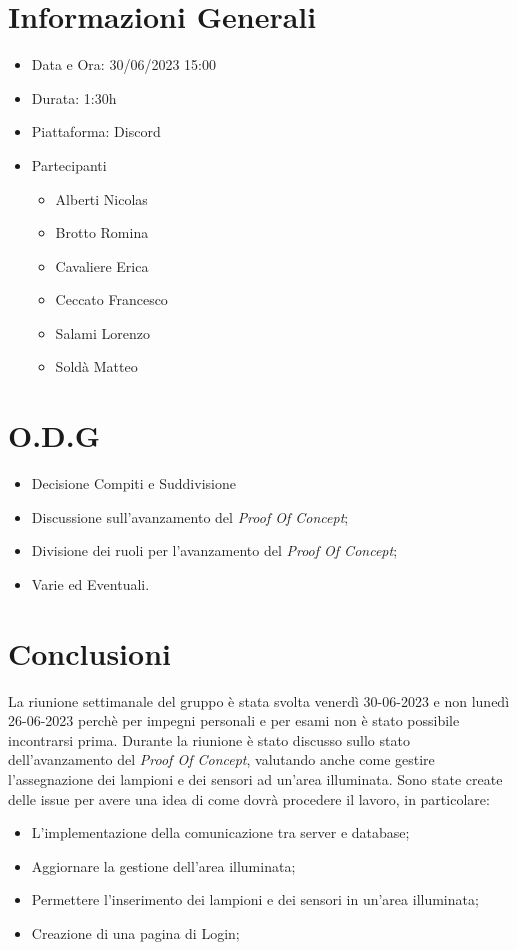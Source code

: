 \documentclass[a4paper, 12pt]{article}
\begin{document}
\makefrontpage

\section*{Informazioni Generali}
\begin{itemize}
    \item Data e Ora: 30/06/2023 15:00
    \item Durata: 1:30h
    \item Piattaforma: Discord
    \item Partecipanti
    \begin{itemize}
        \item Alberti Nicolas
        \item Brotto Romina
        \item Cavaliere Erica
        \item Ceccato Francesco
        \item Salami Lorenzo
        \item Soldà Matteo
    \end{itemize}
\end{itemize}

\section*{O.D.G}
\begin{itemize}
    \item Decisione Compiti e Suddivisione
    \item Discussione sull'avanzamento del \textit{Proof Of Concept};
    \item Divisione dei ruoli per l'avanzamento del \textit{Proof Of Concept};
    \item Varie ed Eventuali.
\end{itemize}

\section*{Conclusioni}
La riunione settimanale del gruppo è stata svolta venerdì 30-06-2023 e non lunedì 26-06-2023 perchè per impegni personali e per esami non è stato possibile incontrarsi prima.
Durante la riunione è stato discusso sullo stato dell'avanzamento del \textit{Proof Of Concept}, valutando anche come gestire l'assegnazione dei lampioni e dei sensori ad un'area illuminata. \newline
Sono state create delle issue per avere una idea di come dovrà procedere il lavoro, in particolare:
\begin{itemize}
    \item L'implementazione della comunicazione tra server e database;
    \item Aggiornare la gestione dell'area illuminata;
    \item Permettere l'inserimento dei lampioni e dei sensori in un'area illuminata;
    \item Creazione di una pagina di Login;
\end{itemize}
\end{document}
